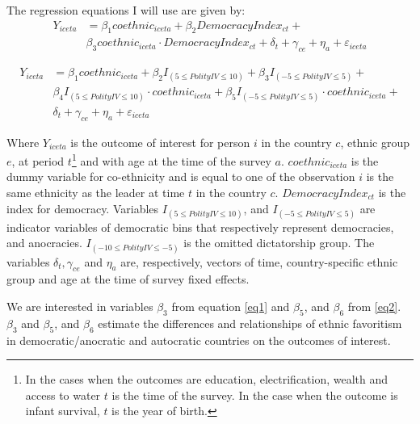 \documentclass{wptemp}
\begin{document}
The regression equations I will use are given by:
\begin{equation}\label{eq1}
\begin{split}
   Y_{iceta} &= \beta_{1}coethnic_{iceta} + \beta_{2}DemocracyIndex_{ct} + \\
   & \beta_{3}coethnic_{iceta} \cdot DemocracyIndex_{ct}   + \delta_{t} + \gamma_{ce} +\eta_{a}  + \varepsilon_{iceta}
\end{split}
\end{equation}

\begin{equation}\label{eq2}
\begin{split}
    Y_{iceta} &= \beta_{1}coethnic_{iceta} + \beta_{2} I_{(5\leq Polity IV \leq 10)} + \beta_{3} I_{(-5\leq Polity IV \leq 5)} + \\
    &\beta_{4} I_{(5\leq Polity IV \leq 10)} \cdot  coethnic_{iceta} + \beta_{5} I_{(-5\leq Polity IV \leq 5)} \cdot  coethnic_{iceta} + \\
    &\delta_{t} + \gamma_{ce} +\eta_{a}  + \varepsilon_{iceta}
    \end{split}
\end{equation}

Where $Y_{iceta}$ is the outcome of interest for person $i$ in the country $c$, ethnic group $e$, at period $t$\footnote{In the cases when the outcomes are education, electrification, wealth and access to water $t$ is the time of the survey. In the case when the outcome is infant survival, $t$ is the year of birth.} and with age at the time of the survey $a$. $coethnic_{iceta}$ is the dummy variable for co-ethnicity and is equal to one of the observation $i$ is the same ethnicity as the leader at time $t$ in the country $c$. $DemocracyIndex_{ct}$ is the index for democracy. Variables $I_{(5\leq Polity IV \leq 10)}$, and $I_{(-5\leq Polity IV \leq 5)}$ are indicator variables of democratic bins that respectively represent democracies, and anocracies. $I_{(-10\leq Polity IV \leq -5)}$ is the omitted dictatorship group. The variables $\delta_{t}, \gamma_{ce}$ and $\eta_{a}$  are, respectively, vectors of time, country-specific ethnic group and age at the time of survey fixed effects.

We are interested in variables $\beta_{3}$ from equation \ref{eq1} and $\beta_{5}$, and $\beta_{6}$ from \ref{eq2}. $\beta_{3}$ and $\beta_{5}$, and $\beta_{6}$ estimate the differences and relationships of ethnic favoritism in democratic/anocratic and autocratic countries on the outcomes of interest.
\end{document}
